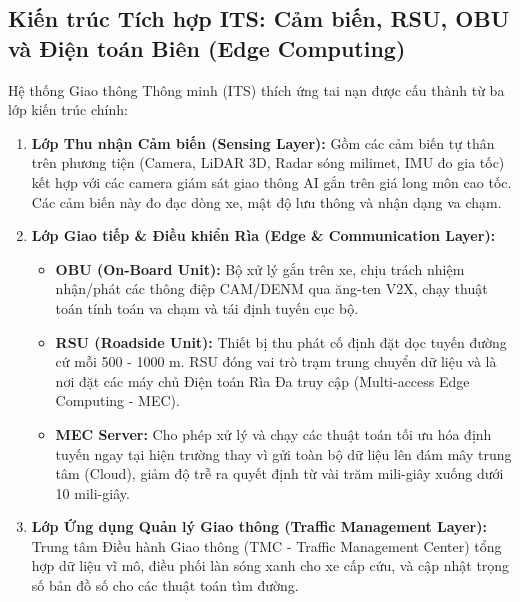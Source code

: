 \documentclass[a4paper]{article}
\begin{document}
\subsection{Kiến trúc Tích hợp ITS: Cảm biến, RSU, OBU và Điện toán Biên (Edge Computing)}
Hệ thống Giao thông Thông minh (ITS) thích ứng tai nạn được cấu thành từ ba lớp kiến trúc chính:
\begin{enumerate}
    \item \textbf{Lớp Thu nhận Cảm biến (Sensing Layer):} Gồm các cảm biến tự thân trên phương tiện (Camera, LiDAR 3D, Radar sóng milimet, IMU đo gia tốc) kết hợp với các camera giám sát giao thông AI gắn trên giá long môn cao tốc. Các cảm biến này đo đạc dòng xe, mật độ lưu thông và nhận dạng va chạm.
    \item \textbf{Lớp Giao tiếp \& Điều khiển Rìa (Edge \& Communication Layer):} 
    \begin{itemize}
        \item \textbf{OBU (On-Board Unit):} Bộ xử lý gắn trên xe, chịu trách nhiệm nhận/phát các thông điệp CAM/DENM qua ăng-ten V2X, chạy thuật toán tính toán va chạm và tái định tuyến cục bộ.
        \item \textbf{RSU (Roadside Unit):} Thiết bị thu phát cố định đặt dọc tuyến đường cứ mỗi 500 - 1000 m. RSU đóng vai trò trạm trung chuyển dữ liệu và là nơi đặt các máy chủ Điện toán Rìa Đa truy cập (Multi-access Edge Computing - MEC).
        \item \textbf{MEC Server:} Cho phép xử lý và chạy các thuật toán tối ưu hóa định tuyến ngay tại hiện trường thay vì gửi toàn bộ dữ liệu lên đám mây trung tâm (Cloud), giảm độ trễ ra quyết định từ vài trăm mili-giây xuống dưới 10 mili-giây.
    \end{itemize}
    \item \textbf{Lớp Ứng dụng Quản lý Giao thông (Traffic Management Layer):} Trung tâm Điều hành Giao thông (TMC - Traffic Management Center) tổng hợp dữ liệu vĩ mô, điều phối làn sóng xanh cho xe cấp cứu, và cập nhật trọng số bản đồ số cho các thuật toán tìm đường.
\end{enumerate}
\end{document}
